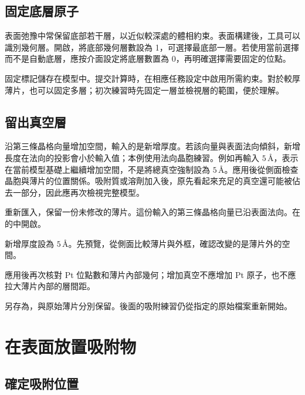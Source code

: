 \subsection{固定底層原子}

表面弛豫中常保留底部若干層，以近似較深處的體相約束。表面構建後，工具可以識別幾何層。開啟，將底部幾何層數設為 1，可選擇最底部一層。若使用當前選擇而不是自動底層，應按介面設定將底層數置為 0，再明確選擇需要固定的位點。

固定標記儲存在模型中。提交計算時，在相應任務設定中啟用所需約束。對於較厚薄片，也可以固定多層；初次練習時先固定一層並檢視層的範圍，便於理解。

\subsection{留出真空層}

沿第三條晶格向量增加空間，輸入的是新增厚度。若該向量與表面法向傾斜，新增長度在法向的投影會小於輸入值；本例使用法向晶胞練習。例如再輸入 $5\,\text{\AA}$，表示在當前模型基礎上繼續增加空間，不是將總真空強制設為 $5\,\text{\AA}$。應用後從側面檢查晶胞與薄片的位置關係。吸附質或溶劑加入後，原先看起來充足的真空還可能被佔去一部分，因此應再次檢視完整模型。



\begin{steps}
  \item 重新匯入，保留一份未修改的薄片。這份輸入的第三條晶格向量已沿表面法向。在的中開啟。
  \item 新增厚度設為 $5\,\text{\AA}$。先預覽，從側面比較薄片與外框，確認改變的是薄片外的空間。
  \item 應用後再次核對 Pt 位點數和薄片內部幾何；增加真空不應增加 Pt 原子，也不應拉大薄片內部的層間距。
  \item 另存為，與原始薄片分別保留。後面的吸附練習仍從指定的原始檔案重新開始。
\end{steps}



\section{在表面放置吸附物}

\subsection{確定吸附位置}

